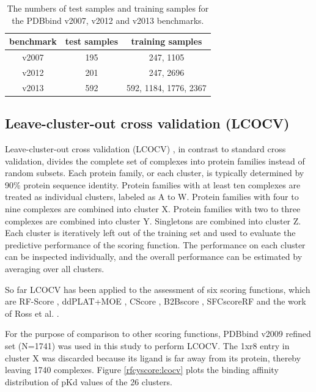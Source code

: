 \begin{table}
\caption{The numbers of test samples and training samples for the PDBbind v2007, v2012 and v2013 benchmarks.}
\label{rfcyscore:benchmarks}
\begin{tabular}{ccc}
\hline
benchmark & test samples & training samples\\
\hline
v2007 & 195 & 247, 1105\\
v2012 & 201 & 247, 2696\\
v2013 & 592 & 592, 1184, 1776, 2367\\
\hline
\end{tabular}
\end{table}

\subsection{Leave-cluster-out cross validation (LCOCV)}

Leave-cluster-out cross validation (LCOCV) \citep{774}, in contrast to standard cross validation, divides the complete set of complexes into protein families instead of random subsets. Each protein family, or each cluster, is typically determined by 90\% protein sequence identity. Protein families with at least ten complexes are treated as individual clusters, labeled as A to W. Protein families with four to nine complexes are combined into cluster X. Protein families with two to three complexes are combined into cluster Y. Singletons are combined into cluster Z. Each cluster is iteratively left out of the training set and used to evaluate the predictive performance of the scoring function. The performance on each cluster can be inspected individually, and the overall performance can be estimated by averaging over all clusters.

So far LCOCV has been applied to the assessment of six scoring functions, which are RF-Score \citep{774,1194,1410}, ddPLAT+MOE \citep{1414}, CScore \citep{1194}, B2Bscore \citep{1410}, SFCscoreRF \citep{1347} and the work of Ross et al. \citep{1415}.

For the purpose of comparison to other scoring functions, PDBbind v2009 refined set (N=1741) was used in this study to perform LCOCV. The 1xr8 entry in cluster X was discarded because its ligand is far away from its protein, thereby leaving 1740 complexes. Figure \ref{rfcyscore:lcocv} plots the binding affinity distribution of pKd values of the 26 clusters.

